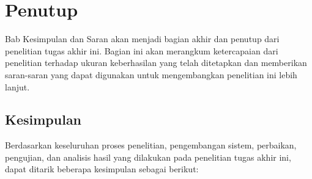 \chapter{Penutup}

Bab Kesimpulan dan Saran akan menjadi bagian akhir dan penutup dari penelitian tugas akhir ini. Bagian ini akan merangkum ketercapaian dari penelitian terhadap ukuran keberhasilan yang telah ditetapkan dan memberikan saran-saran yang dapat digunakan untuk mengembangkan penelitian ini lebih lanjut.

\section{Kesimpulan}

Berdasarkan keseluruhan proses penelitian, pengembangan sistem, perbaikan, pengujian, dan analisis hasil yang dilakukan pada penelitian tugas akhir ini, dapat ditarik beberapa kesimpulan sebagai berikut:

